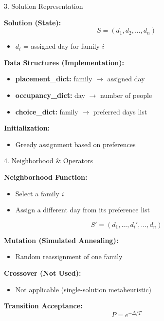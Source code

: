 \documentclass[aspectratio=169]{beamer}
\begin{document}
\begin{frame}{3. Solution Representation}

\textbf{Solution (State):}
\[
S = (d_1, d_2, ..., d_n)
\]

\begin{itemize}
    \item $d_i$ = assigned day for family $i$
\end{itemize}

\vspace{0.3cm}

\textbf{Data Structures (Implementation):}
\begin{itemize}
    \item \textbf{placement\_dict:} family $\rightarrow$ assigned day
    \item \textbf{occupancy\_dict:} day $\rightarrow$ number of people
    \item \textbf{choice\_dict:} family $\rightarrow$ preferred days list
\end{itemize}

\vspace{0.3cm}

\textbf{Initialization:}
\begin{itemize}
    \item Greedy assignment based on preferences
\end{itemize}

\end{frame}


\begin{frame}{4. Neighborhood \& Operators}

\textbf{Neighborhood Function:}
\begin{itemize}
    \item Select a family $i$
    \item Assign a different day from its preference list
\end{itemize}

\[
S' = (d_1, ..., d_i', ..., d_n)
\]

\vspace{0.3cm}

\textbf{Mutation (Simulated Annealing):}
\begin{itemize}
    \item Random reassignment of one family
\end{itemize}

\vspace{0.3cm}

\textbf{Crossover (Not Used):}
\begin{itemize}
    \item Not applicable (single-solution metaheuristic)
\end{itemize}

\vspace{0.3cm}

\textbf{Transition Acceptance:}
\[
P = e^{-\Delta / T}
\]

\end{frame}
\end{document}
